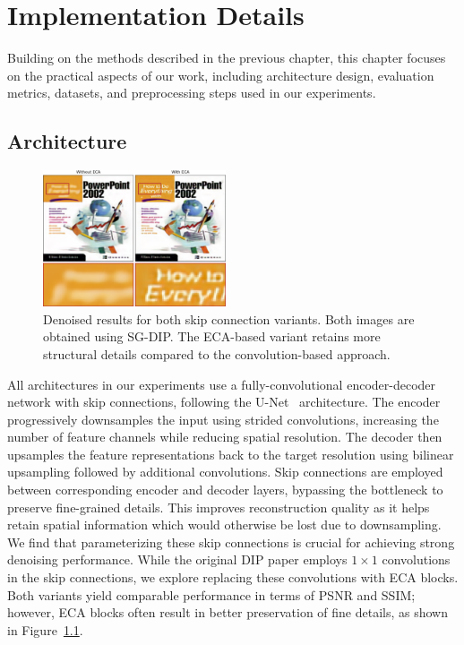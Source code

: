 \chapter{Implementation Details}

Building on the methods described in the previous chapter, this chapter focuses on the practical aspects of our work, including architecture design, evaluation metrics, datasets, and preprocessing steps used in our experiments.
\section{Architecture}\label{sec:architecture}

\begin{figure}
    \vspace{-12pt}
    \centering
    \includegraphics[width=0.48\textwidth]{img/fig_5.1.png}
    \caption{
        Denoised results for both skip connection variants.
        Both images are obtained using SG-DIP\@.
        The ECA-based variant retains more structural details compared to the convolution-based approach.
    }\label{fig:ECA}
\end{figure}
All architectures in our experiments use a fully-convolutional encoder-decoder network with skip connections, following the U-Net~\cite{U-Net} architecture.
The encoder progressively downsamples the input using strided convolutions, increasing the number of feature channels while reducing spatial resolution.
The decoder then upsamples the feature representations back to the target resolution using bilinear upsampling followed by additional convolutions.
Skip connections are employed between corresponding encoder and decoder layers, bypassing the bottleneck to preserve fine-grained details.
This improves reconstruction quality as it helps retain spatial information which would otherwise be lost due to downsampling.
We find that parameterizing these skip connections is crucial for achieving strong denoising performance.
While the original DIP paper employs $1 \times 1$ convolutions in the skip connections, we explore replacing these convolutions with ECA blocks.
Both variants yield comparable performance in terms of PSNR and SSIM\@; however, ECA blocks often result in better preservation of fine details, as shown in Figure~\ref{fig:ECA}.

